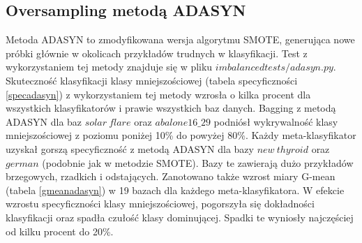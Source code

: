 \subsection{Oversampling metodą ADASYN}
Metoda ADASYN to zmodyfikowana wersja algorytmu SMOTE, generująca nowe próbki głównie w okolicach przykładów trudnych w klasyfikacji. Test z wykorzystaniem tej metody znajduje się w pliku $imbalancedtests/adasyn.py$. Skuteczność klasyfikacji klasy mniejszościowej (tabela specyficzności \ref{specadasyn}) z wykorzystaniem tej metody wzrosła o kilka procent dla wszystkich klasyfikatorów i prawie wszystkich baz danych. Bagging z metodą ADASYN dla baz $solar\: flare$ oraz $abalone16\_29$ podniósł wykrywalność klasy mniejszościowej z poziomu poniżej 10\% do powyżej 80\%. Każdy meta-klasyfikator uzyskał gorszą specyficzność z metodą ADASYN dla bazy $new\: thyroid$ oraz $german$ (podobnie jak w metodzie SMOTE). Bazy te zawierają dużo przykładów brzegowych, rzadkich i odstających. Zanotowano także wzrost miary G-mean (tabela \ref{gmeanadasyn}) w 19 bazach dla każdego meta-klasyfikatora. W efekcie wzrostu specyficzności klasy mniejszościowej, pogorszyła się dokładności klasyfikacji oraz spadła czułość klasy dominującej. Spadki te wyniosły najczęściej od kilku procent do 20\%.
